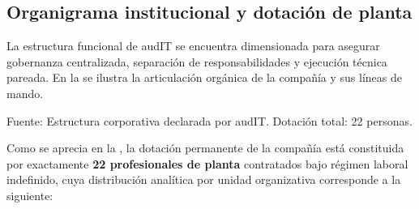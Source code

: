 \subsection{Organigrama institucional y dotación de planta}\label{sec:1-organigrama}

La estructura funcional de audIT se encuentra dimensionada para asegurar gobernanza centralizada, separación de responsabilidades y ejecución técnica pareada. En la  se ilustra la articulación orgánica de la compañía y sus líneas de mando.


Fuente: Estructura corporativa declarada por audIT. Dotación total: 22 personas.

Como se aprecia en la , la dotación permanente de la compañía está constituida por exactamente \textbf{22 profesionales de planta} contratados bajo régimen laboral indefinido, cuya distribución analítica por unidad organizativa corresponde a la siguiente:

